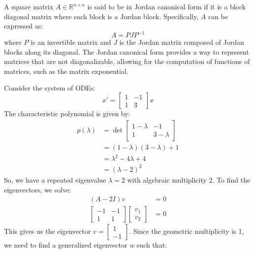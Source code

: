 \documentclass[11pt]{article}
\begin{document}
\begin{definition}
    A square matrix \( A \in \mathbb{R}^{n \times n} \) is said to be in Jordan canonical form if it is a block diagonal matrix where each block is a Jordan block. Specifically, \( A \) can be expressed as:
    \begin{equation}
    A = PJP^{-1}
    \end{equation}
    where \( P \) is an invertible matrix and \( J \) is the Jordan matrix composed of Jordan blocks along its diagonal. The Jordan canonical form provides a way to represent matrices that are not diagonalizable, allowing for the computation of functions of matrices, such as the matrix exponential.
\end{definition}
\begin{example}
    Consider the system of ODEs:
    $$x' = \begin{bmatrix}
    1 & -1 \\
    1 & 3
    \end{bmatrix} x$$
    The characteristic polynomial is given by:
    \begin{align*}
        p(\lambda) &= \det\begin{bmatrix}
        1 - \lambda & -1 \\
        1 & 3 - \lambda
        \end{bmatrix} \\
        &= (1 - \lambda)(3 - \lambda) + 1 \\
        &= \lambda^2 - 4\lambda + 4 \\
        &= (\lambda - 2)^2
    \end{align*}
    So, we have a repeated eigenvalue \( \lambda = 2 \) with algebraic multiplicity 2. To find the eigenvectors, we solve:
    \begin{align*}
        (A - 2I)v &= 0 \\
        \begin{bmatrix}
        -1 & -1 \\
        1 & 1
        \end{bmatrix} \begin{bmatrix}
        v_1 \\ v_2
        \end{bmatrix} &= 0
    \end{align*}
    This gives us the eigenvector \( v = \begin{bmatrix}1 \\ -1 \end{bmatrix} \). Since the geometric multiplicity is 1, we need to find a generalized eigenvector \( w \) such that:

\end{example}
\end{document}

